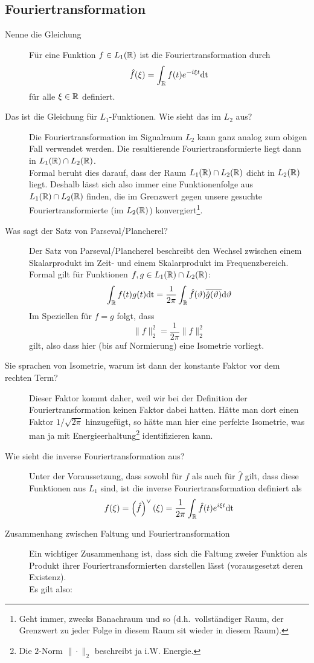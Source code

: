 \subsection{Fouriertransformation}
\begin{description}
	\item[Nenne die Gleichung]
      Für eine Funktion $f \in L_1(\mathbb{R})$ ist die Fouriertransformation durch
      $$ \hat f(\xi) = \int_{\mathbb{R}} f(t) e^{-i\xi t}\text{dt} $$
      für alle $\xi \in \mathbb{R}$ definiert.
    \item[Das ist die Gleichung für $L_1$-Funktionen. Wie sieht das im $L_2$ aus?]
      Die Fouriertransformation im Signalraum $L_2$ kann ganz analog zum obigen Fall verwendet werden.
      Die resultierende Fouriertransformierte liegt dann in $L_1(\mathbb{R}) \cap L_2(\mathbb{R})$.\\
      Formal beruht dies darauf, dass der Raum $L_1(\mathbb{R})\cap L_2(\mathbb{R})$ dicht in $L_2(\mathbb{R})$ liegt. Deshalb
      lässt sich also immer eine Funktionenfolge aus $L_1(\mathbb{R})\cap L_2(\mathbb{R})$ finden, die im Grenzwert
      gegen unsere gesuchte Fouriertransformierte (im $L_2(\mathbb{R})$) konvergiert\footnote{Geht immer, zwecks 
      Banachraum und so (d.h.\ vollständiger Raum, der Grenzwert zu jeder Folge in diesem Raum sit 
      wieder in diesem Raum).}.
  \item[Was sagt der Satz von Parseval/Plancherel?]
    Der Satz von Parseval/Plancherel beschreibt den Wechsel zwischen einem 
    Skalarprodukt im Zeit- und einem Skalarprodukt im Frequenzbereich.\\
    Formal gilt für Funktionen $f, g \in L_1(\mathbb{R}) \cap L_2(\mathbb{R})$:
    $$ \int_{\mathbb{R}} f(t)g(t)\text{dt} = \frac{1}{2\pi}\int_{\mathbb{R}}\hat f(\vartheta)\overline{\hat 
    g(\vartheta)}\text{d} \vartheta $$
    Im Speziellen für $f=g$ folgt, dass
    $$ \|f\|_2^2 = \frac{1}{2\pi}\|\hat f\|_2^2 $$
    gilt, also dass hier (bis auf Normierung) eine Isometrie vorliegt.
  \item[Sie sprachen von Isometrie, warum ist dann der konstante Faktor vor dem rechten Term?]
    Dieser Faktor kommt daher, weil wir bei der Definition der Fouriertransformation keinen Faktor
    dabei hatten. Hätte man dort einen Faktor $1/\sqrt{2\pi}$ hinzugefügt, so hätte man hier eine
    perfekte Isometrie, was man ja mit Energieerhaltung\footnote{Die $2$-Norm $\|\cdot\|_2$ 
    beschreibt ja i.W. Energie.} identifizieren kann.
\item[Wie sieht die inverse Fouriertransformation aus?]
    Unter der Voraussetzung, dass sowohl für $f$ als auch für $\hat f$ gilt, dass
    diese Funktionen aus $L_1$ sind, ist die inverse Fouriertransformation 
    definiert als
    $$ f(\xi) = \left(\hat f\right)^{\lor{}}(\xi) = \frac{1}{2\pi}\int_{\mathbb{R}} \hat f(t)e^{i\xi 
    t}\text{dt} $$      
\item[Zusammenhang zwischen Faltung und Fouriertransformation]
    Ein wichtiger Zusammenhang ist, dass sich die Faltung zweier Funktion als Produkt ihrer 
    Fouriertransformierten darstellen lässt (vorausgesetzt deren Existenz).\\
    Es gilt also:
    

\end{description}

